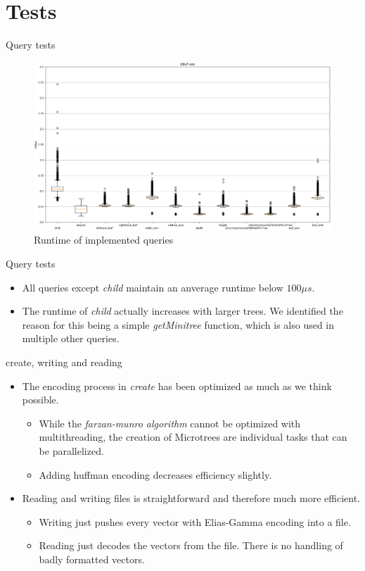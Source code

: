 \documentclass{beamer}
\begin{document}
\section{Tests}

\begin{frame}{Query tests}
	\begin{figure}[H]
	\includegraphics[scale=0.25]{DBLP_Queries}
	\caption{Runtime of implemented queries}
	\label{complexQue:image1}
	\end{figure}
\end{frame}

\begin{frame}{Query tests}
	\begin{itemize}
	\item
		All queries except \textit{child} maintain an anverage runtime below $100 \mu s$.
	\item
		The runtime of \textit{child} actually increases with larger trees. We identified the reason for this being a simple \textit{getMinitree} function, which is also used in multiple other queries.
	\end{itemize}
\end{frame}

\begin{frame}{create, writing and reading}
	\begin{itemize}
	\item
		The encoding process in \textit{create} has been optimized as much as we think possible.
		\begin{itemize}
		\item
			While the \textit{farzan-munro algorithm} cannot be optimized with multithreading, the creation of Microtrees are individual tasks that can be parallelized.
		\item
			Adding huffman encoding decreases efficiency slightly.
		\end{itemize}
	\item
		Reading and writing files is straightforward and therefore much more efficient.
		\begin{itemize}
		\item
			 Writing just pushes every vector with Elias-Gamma encoding into a file.
		\item
			Reading just decodes the vectors from the file. There is no handling of badly formatted vectors.
		\end{itemize}
	\end{itemize}
\end{frame}
\end{document}
